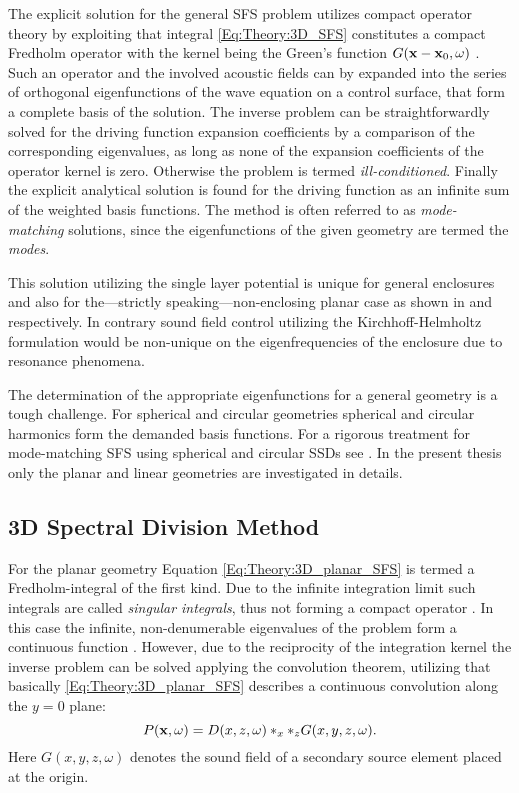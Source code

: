 The explicit solution for the general SFS problem utilizes compact operator theory by exploiting that integral \eqref{Eq:Theory:3D_SFS} constitutes a compact Fredholm operator with the kernel being the Green's function $G(\mathbf{x} - \mathbf{x}_0 , \omega )$ \cite{Ahrens2012,MorseFeshbach1953}.
Such an operator and the involved acoustic fields can by expanded into the series of orthogonal eigenfunctions of the wave equation on a control surface, that form a complete basis of the solution.
The inverse problem can be straightforwardly solved for the driving function expansion coefficients by a comparison of the corresponding eigenvalues, as long as none of the expansion coefficients of the operator kernel is zero.
Otherwise the problem is termed \emph{ill-conditioned}.
Finally the explicit analytical solution is found for the driving function as an infinite sum of the weighted basis functions.
The method is often referred to as \emph{mode-matching} solutions, since the eigenfunctions of the given geometry are termed the \emph{modes}.

This solution utilizing the single layer potential is unique for general enclosures and also for the---strictly speaking---non-enclosing planar case as shown in \cite{Zotter2013:uniqueness} and \cite{Fazi2010} respectively. In contrary sound field control utilizing the Kirchhoff-Helmholtz formulation would be non-unique on the eigenfrequencies of the enclosure due to resonance phenomena.

The determination of the appropriate eigenfunctions for a general geometry is a tough challenge.
For spherical and circular geometries spherical and circular harmonics form the demanded basis functions. For a rigorous treatment for mode-matching SFS using spherical and circular SSDs see \cite{Ahrens2010phd,Zotter2009phd,Ahrens2012,Ahrens2009:circularSSD_mismatch,Ahrens2009:circular25D_SFR,Ahrens2008:Analytical_Circ_Spherical_SFS}.
In the present thesis only the planar and linear geometries are investigated in details.
 
\subsection{3D Spectral Division Method}
For the planar geometry Equation \eqref{Eq:Theory:3D_planar_SFS} is termed a Fredholm-integral of the first kind. Due to the infinite integration limit such integrals are called \emph{singular integrals}, thus not forming a compact operator \cite[p.~921.]{MorseFeshbach1953}. 
In this case the infinite, non-denumerable eigenvalues of the problem form a continuous function \cite{MorseFeshbach1953,Schultz2014:Comparing_approaches}.
However, due to the reciprocity of the integration kernel the inverse problem can be solved applying the convolution theorem, utilizing that basically \eqref{Eq:Theory:3D_planar_SFS} describes a continuous convolution along the $y=0$ plane:
\begin{equation}
P(\mathbf{x},\omega) = D(x,z,\omega)\ast_{x} \ast_{z} G(x,y,z,\omega).
\end{equation}
Here $G(x,y,z,\omega)$ denotes the sound field of a secondary source element placed at the origin.

